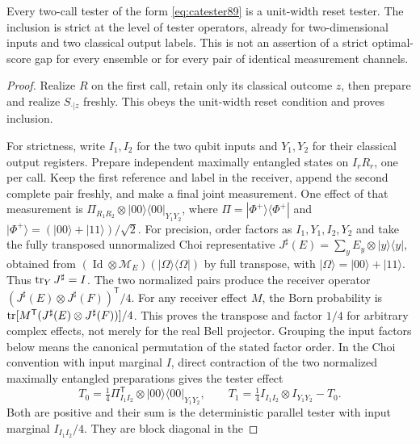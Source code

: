\begin{proposition}\label{prop:memorycomparison89}
Every two-call tester of the form \eqref{eq:catester89} is a unit-width
reset tester.  The inclusion is strict at the level of tester
operators, already for two-dimensional inputs and two classical
output labels.  This is not an assertion of a strict optimal-score
gap for every ensemble or for every pair of identical measurement
channels.
\end{proposition}
\begin{proof}
Realize $R$ on the first call, retain only its classical outcome
$z$, then prepare and realize $S_{\cdot|z}$ freshly.  This obeys the
unit-width reset condition and proves inclusion.

For strictness, write $I_1,I_2$ for the two qubit inputs and $Y_1,Y_2$
for their classical output registers.  Prepare independent maximally
entangled states on $I_rR_r$, one per call.  Keep the first reference
and label in the receiver, append the second complete pair freshly,
and make a final joint measurement.  One effect of that measurement
is $\Pi_{R_1R_2}\otimes|00\rangle\langle00|_{Y_1Y_2}$, where
$\Pi=|\Phi^+\rangle\langle\Phi^+|$ and
$|\Phi^+\rangle=(|00\rangle+|11\rangle)/\sqrt2$.
For precision, order factors as $I_1,Y_1,I_2,Y_2$ and take the fully
transposed unnormalized Choi representative
$J^\sharp(E)=\sum_yE_y\otimes|y\rangle\langle y|$, obtained from
$(\operatorname{Id}\otimes\mathcal M_E)(|\Omega\rangle\langle\Omega|)$
by full transpose, with $|\Omega\rangle=|00\rangle+|11\rangle$.
Thus $\operatorname{tr}_YJ^\sharp=I$.  The two normalized pairs produce the receiver
operator $(J^\sharp(E)\otimes J^\sharp(F))^{\mathsf T}/4$.
For any receiver effect $M$, the Born probability is
$\operatorname{tr}[M^{\mathsf T}(J^\sharp(E)\otimes J^\sharp(F))]/4$.
This proves the transpose and factor $1/4$ for arbitrary complex effects,
not merely for the real Bell projector.  Grouping the input factors below
means the canonical permutation of the stated factor order.
In the Choi convention with input marginal $I$, direct contraction
of the two normalized maximally entangled preparations gives the
tester effect
\begin{equation}\label{eq:memorywitness89}
 T_0=\tfrac14\Pi^{\mathsf T}_{I_1I_2}
                      \otimes|00\rangle\langle00|_{Y_1Y_2},
 \qquad T_1=\tfrac14 I_{I_1I_2}\otimes I_{Y_1Y_2}-T_0.
\end{equation}
Both are positive and their sum is the deterministic parallel tester
with input marginal $I_{I_1I_2}/4$.  They are block diagonal in the

\end{proof}
